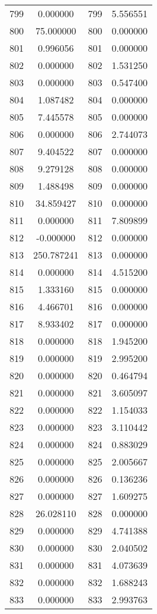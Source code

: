 \documentclass[12pt]{article}
\begin{document}
\begin{longtable}{@{}cccc@{}}
799 & 0.000000 & 799 & 5.556551 \\
800 & 75.000000 & 800 & 0.000000 \\
801 & 0.996056 & 801 & 0.000000 \\
802 & 0.000000 & 802 & 1.531250 \\
803 & 0.000000 & 803 & 0.547400 \\
804 & 1.087482 & 804 & 0.000000 \\
805 & 7.445578 & 805 & 0.000000 \\
806 & 0.000000 & 806 & 2.744073 \\
807 & 9.404522 & 807 & 0.000000 \\
808 & 9.279128 & 808 & 0.000000 \\
809 & 1.488498 & 809 & 0.000000 \\
810 & 34.859427 & 810 & 0.000000 \\
811 & 0.000000 & 811 & 7.809899 \\
812 & -0.000000 & 812 & 0.000000 \\
813 & 250.787241 & 813 & 0.000000 \\
814 & 0.000000 & 814 & 4.515200 \\
815 & 1.333160 & 815 & 0.000000 \\
816 & 4.466701 & 816 & 0.000000 \\
817 & 8.933402 & 817 & 0.000000 \\
818 & 0.000000 & 818 & 1.945200 \\
819 & 0.000000 & 819 & 2.995200 \\
820 & 0.000000 & 820 & 0.464794 \\
821 & 0.000000 & 821 & 3.605097 \\
822 & 0.000000 & 822 & 1.154033 \\
823 & 0.000000 & 823 & 3.110442 \\
824 & 0.000000 & 824 & 0.883029 \\
825 & 0.000000 & 825 & 2.005667 \\
826 & 0.000000 & 826 & 0.136236 \\
827 & 0.000000 & 827 & 1.609275 \\
828 & 26.028110 & 828 & 0.000000 \\
829 & 0.000000 & 829 & 4.741388 \\
830 & 0.000000 & 830 & 2.040502 \\
831 & 0.000000 & 831 & 4.073639 \\
832 & 0.000000 & 832 & 1.688243 \\
833 & 0.000000 & 833 & 2.993763 \\

\end{longtable}
\end{document}
